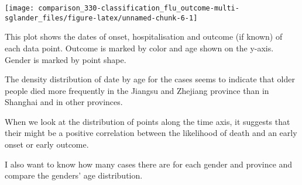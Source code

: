 \documentclass[]{book}
\begin{document}
\begin{center}\texttt{[image: comparison\_330-classification\_flu\_outcome-multi-sglander\_files/figure-latex/unnamed-chunk-6-1]} \end{center}

This plot shows the dates of onset, hospitalisation and outcome (if known) of each data point. Outcome is marked by color and age shown on the y-axis. Gender is marked by point shape.

The density distribution of date by age for the cases seems to indicate that older people died more frequently in the Jiangsu and Zhejiang province than in Shanghai and in other provinces.

When we look at the distribution of points along the time axis, it suggests that their might be a positive correlation between the likelihood of death and an early onset or early outcome.

I also want to know how many cases there are for each gender and province and compare the genders' age distribution.
\end{document}
